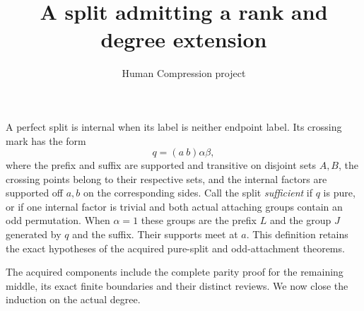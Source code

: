 \documentclass[11pt,a4paper]{article}
\title{A split admitting a rank and degree extension}
\author{Human Compression project}\date{}
\begin{document}
\maketitle
A perfect split is internal when its label is neither endpoint label.
Its crossing mark has the form
\[
                    q=(a\ b)\alpha\beta,
\]
where the prefix and suffix are supported and transitive on disjoint
sets $A,B$, the crossing points belong to their respective sets,
and the internal factors are supported off $a,b$ on the corresponding
sides. Call the split \emph{sufficient} if $q$ is pure, or if one
internal factor is trivial and both actual attaching groups contain
an odd permutation. When $\alpha=1$ these groups are the prefix
$L$ and the group $J$ generated by $q$ and the suffix. Their supports
meet at $a$. This definition retains the exact hypotheses of the
acquired pure-split and odd-attachment theorems.

The acquired components include the complete parity proof for the
remaining middle, its exact finite boundaries and their distinct reviews.
We now close the induction on the actual degree.
\end{document}
